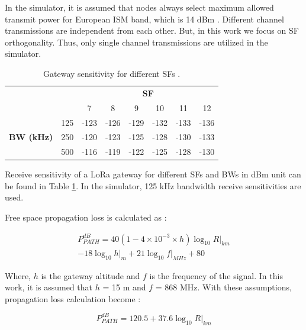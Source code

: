 \documentclass[conference]{IEEEtran}
\begin{document}
In the simulator, it is assumed that nodes always select maximum allowed transmit power for European ISM band, which is 14 dBm \cite{lorawan.regional.parameters}. Different channel transmissions are independent from each other. But, in this work we focus on SF orthogonality. Thus, only single channel transmissions are utilized in the simulator.

\begin{table}
\centering
\caption{Gateway sensitivity for different SFs \cite{SX1276}.}
\label{table:gw_sf_sensitivity}
\begin{tabular}{|c|c|c|c|c|c|c|c|}
\hline
\multicolumn{2}{|c|}{\multirow{2}{*}{}} & \multicolumn{6}{c|}{\textbf{SF}} \\ \cline{3-8}
\multicolumn{2}{|c|}{}                  &    7 &    8 &    9 &   10 &   11 &   12 \\ \hline
\multirow{3}{*}{\textbf{BW (kHz)}}  & 125 & -123 & -126 & -129 & -132 & -133 & -136 \\ \cline{2-8}
                                    & 250 & -120 & -123 & -125 & -128 & -130 & -133 \\ \cline{2-8}
                                    & 500 & -116 & -119 & -122 & -125 & -128 & -130 \\ \hline
\end{tabular}
\end{table}

Receive sensitivity of a LoRa gateway for different SFs and BWs in dBm unit can be found in Table \ref{table:gw_sf_sensitivity}. In the simulator, 125 kHz bandwidth receive sensitivities are used.

Free space propagation loss is calculated as \cite{TR136.942}:

\begin{equation} \label{eq:propagation_loss}
\begin{split}
P^{dB}_{PATH} = 40(1 - 4 \times 10^{-3} \times h){\log_{10} R|_{km}} \\
- 18 {\log_{10} h|_{m}} + 21 {\log_{10} f|_{MHz}} + 80
\end{split}
\end{equation}

Where, $h$ is the gateway altitude and $f$ is the frequency of the signal. In this work, it is assumed that $h$ = 15 m and $f$ = 868 MHz. With these assumptions, propagation loss calculation become \cite{7996384}:

\begin{equation} \label{eq:propagation_loss_simplified}
P^{dB}_{PATH} = 120.5 + 37.6 {\log_{10} R|_{km}}
\end{equation}
\end{document}
